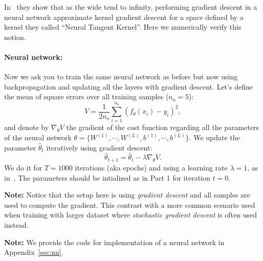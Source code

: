 \documentclass[a4paper,10pt]{article}
\newenvironment{note}
{
\begin{center}
\begin{lrbox}{\mybox}
\begin{minipage}{42em}}
{\end{minipage}
\end{lrbox}\fbox{\usebox{\mybox}}
\end{center}}
\begin{document}
In~\citep{jacot_neural_2018} they show that as the wide tend to infinity, performing gradient descent in a neural network approximate kernel gradient descent for a space defined by a kernel they called ``Neural Tangent Kernel''. Here we numerically verify this notion.


\paragraph{Neural network:} Now we ask you to train the same neural network as before but now using backpropagation and updating all the layers with gradient descent. Let's define the mean of square errors over all training samples ($n_{\text{o}} = 5$):
\begin{equation}
    V = \frac{1}{2n_o}\sum_{i=1}^{n_{\text{o}}} (f_{\theta}(x_i) - y_i)^2,
\end{equation}
and denote by $\nabla_\theta V$  the gradient of the cost function regarding all the parameters of the neural network
$\theta = \{W^{(1)}, \cdots,  W^{(L)}, b^{(1)}, \cdots,  b^{(L)}\}$. We update the parameter $\hat{\theta}_t$ iteratively using gradient descent:
\begin{equation}
    \hat{\theta}_{t + 1} =  \hat{\theta}_{t} - \lambda \nabla_\theta V.
\end{equation}
We do it for $T = 1000$ iterations (aka epochs) and using a learning rate $\lambda = 1$, as in~\citep{jacot_neural_2018}.
The parameters should be intialized as in Part 1 for iteration $t = 0$.
\begin{note}
    \textbf{Note:} Notice that the setup here is using \textit{gradient descent} and all samples are used to compute the gradient. This contrast with a more common scenario used when training with larger dataset where \textit{stochastic gradient descent} is often used instead.
\end{note}

\begin{note}
    \textbf{Note:} We provide the code for implementation of a neural network in Appendix~\ref{sec:nn}.
\end{note}
\end{document}

